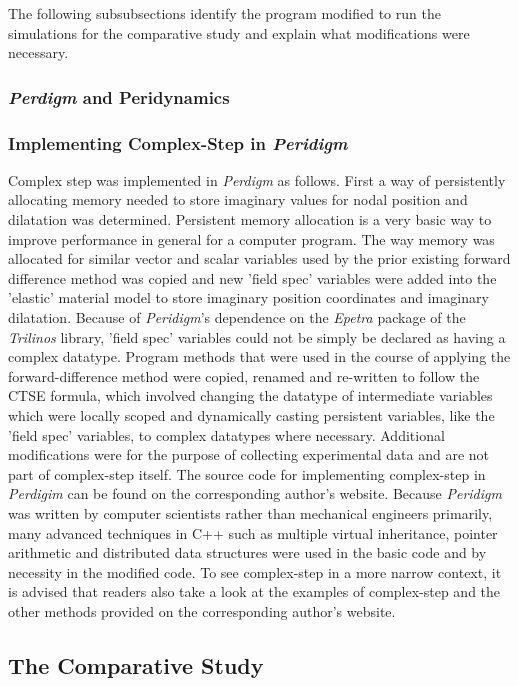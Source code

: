 \documentclass[preprint,12pt]{elsarticle}
\begin{document}
The following subsubsections identify the program modified to run the simulations for the
comparative study and explain what modifications were necessary.

\subsubsection{\emph{Perdigm} and Peridynamics} 
\subsubsection{Implementing Complex-Step in \emph{Peridigm}} 

Complex step was implemented in \emph{Perdigm} as follows. First a way of
persistently allocating memory needed to store imaginary values for nodal
position and dilatation was determined. Persistent memory allocation is a very
basic way to improve performance in general for a computer program. The way
memory was allocated for similar vector and scalar variables used by the prior
existing forward difference method was copied and new 'field spec' variables
were added into the 'elastic' material model to store imaginary position
coordinates and imaginary dilatation. Because of \emph{Peridigm}'s dependence
on the \emph{Epetra} package of the \emph{Trilinos} library, 'field spec'
variables could not be simply be declared as having a complex datatype. Program
methods that were used in the course of applying the forward-difference method
were copied, renamed and re-written to follow the CTSE formula, which involved
changing the datatype of intermediate variables which were locally scoped and
dynamically casting persistent variables, like the 'field spec' variables, to
complex datatypes where necessary. Additional modifications were for the
purpose of collecting experimental data and are not part of complex-step
itself. The source code for implementing complex-step in \emph{Perdigim} can be
found on the corresponding author's website.  Because \emph{Peridigm} was
written by computer scientists rather than mechanical engineers primarily, many
advanced techniques in C++ such as multiple virtual inheritance, pointer
arithmetic and distributed data structures were used in the basic code and by
necessity in the modified code.  To see complex-step in a more narrow context,
it is advised that readers also take a look at the examples of complex-step and
the other methods provided on the corresponding author's website.

\subsection{The Comparative Study} 
\label{tcs}
\end{document}

